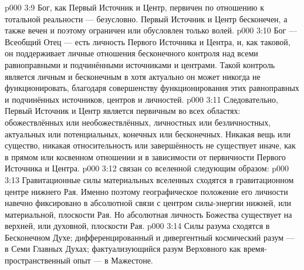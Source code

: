 \vs p000 3:9 \pc Бог, как Первый Источник и Центр, первичен по отношению к тотальной реальности --- безусловно. Первый Источник и Центр бесконечен, а также вечен и поэтому ограничен или обусловлен только волей.
\vs p000 3:10 Бог --- Всеобщий Отец --- есть личность Первого Источника и Центра, и, как таковой, он поддерживает личные отношения бесконечного контроля над всеми равноправными и подчинёнными источниками и центрами. Такой контроль является личным и бесконечным в  хотя актуально он может никогда не функционировать, благодаря совершенству функционирования этих равноправных и подчинённых источников, центров и личностей.
\vs p000 3:11 Следовательно, Первый Источник и Центр является первичным во всех областях: обожествлённых или необожествлённых, личностных или безличностных, актуальных или потенциальных, конечных или бесконечных. Никакая вещь или существо, никакая относительность или завершённость не существует иначе, как в прямом или косвенном отношении и в зависимости от первичности Первого Источника и Центра.
\vs p000 3:12 \pc {} связан со вселенной следующим образом:
\vs p000 3:13 Гравитационные силы материальных вселенных сходятся в гравитационном центре нижнего Рая. Именно поэтому географическое положение его личности навечно фиксировано в абсолютной связи с центром силы\hyp{}энергии нижней, или материальной, плоскости Рая. Но абсолютная личность Божества существует на верхней, или духовной, плоскости Рая.
\vs p000 3:14 Силы разума сходятся в Бесконечном Духе; дифференцированный и дивергентный космический разум --- в Семи Главных Духах; фактуализующийся разум Верховного как время\hyp{}пространственный опыт --- в Мажестоне.
